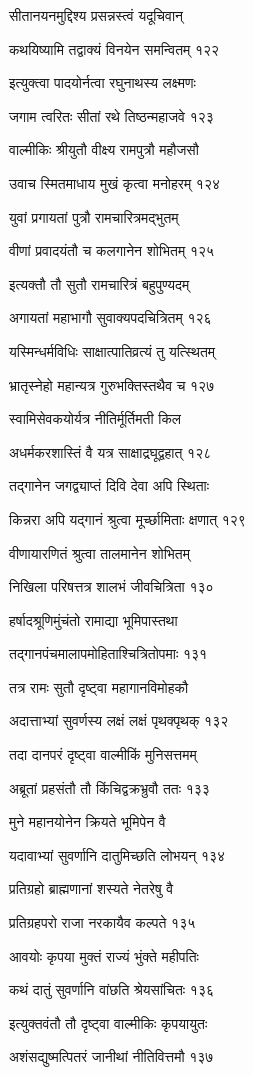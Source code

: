 सीतानयनमुद्दिश्य प्रसन्नस्त्वं यदूचिवान्

कथयिष्यामि तद्वाक्यं विनयेन समन्वितम् १२२

इत्युक्त्वा पादयोर्नत्वा रघुनाथस्य लक्ष्मणः

जगाम त्वरितः सीतां रथे तिष्ठन्महाजवे १२३

वाल्मीकिः श्रीयुतौ वीक्ष्य रामपुत्रौ महौजसौ

उवाच स्मितमाधाय मुखं कृत्वा मनोहरम् १२४

युवां प्रगायतां पुत्रौ रामचारित्रमद्भुतम्

वीणां प्रवादयंतौ च कलगानेन शोभितम् १२५

इत्यक्तौ तौ सुतौ रामचारित्रं बहुपुण्यदम्

अगायतां महाभागौ सुवाक्यपदचित्रितम् १२६

यस्मिन्धर्मविधिः साक्षात्पातिव्रत्यं तु यत्स्थितम्

भ्रातृस्नेहो महान्यत्र गुरुभक्तिस्तथैव च १२७

स्वामिसेवकयोर्यत्र नीतिर्मूर्तिमती किल

अधर्मकरशास्तिं वै यत्र साक्षाद्रघूद्वहात् १२८

तद्गानेन जगद्व्याप्तं दिवि देवा अपि स्थिताः

किन्नरा अपि यद्गानं श्रुत्वा मूर्च्छामिताः क्षणात् १२९

वीणायारणितं श्रुत्वा तालमानेन शोभितम्

निखिला परिषत्तत्र शालभं जीवचित्रिता १३०

हर्षादश्रूणिमुंचंतो रामाद्या भूमिपास्तथा

तद्गानपंचमालापमोहिताश्चित्रितोपमाः १३१

तत्र रामः सुतौ दृष्ट्वा महागानविमोहकौ

अदात्ताभ्यां सुवर्णस्य लक्षं लक्षं पृथक्पृथक् १३२

तदा दानपरं दृष्ट्वा वाल्मीकिं मुनिसत्तमम्

अब्रूतां प्रहसंतौ तौ किंचिद्वक्रभ्रुवौ ततः १३३

मुने महानयोनेन क्रियते भूमिपेन वै

यदावाभ्यां सुवर्णानि दातुमिच्छति लोभयन् १३४

प्रतिग्रहो ब्राह्मणानां शस्यते नेतरेषु वै

प्रतिग्रहपरो राजा नरकायैव कल्पते १३५

आवयोः कृपया मुक्तं राज्यं भुंक्ते महीपतिः

कथं दातुं सुवर्णानि वांछति श्रेयसांचितः १३६

इत्युक्तवंतौ तौ दृष्ट्वा वाल्मीकिः कृपयायुतः

अशंसद्युष्मत्पितरं जानीथां नीतिवित्तमौ १३७

